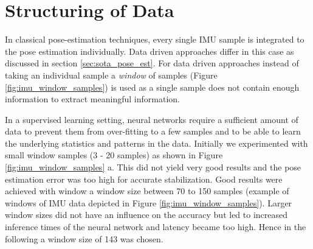 \section{Structuring of Data}
\label{sec:data_structure}
In classical pose-estimation techniques, every single IMU sample is integrated to the pose estimation individually. Data driven approaches differ in this case as discussed in section \ref{sec:sota_pose_est}. For data driven approaches instead of taking an individual sample a \textit{window} of samples (Figure \ref{fig:imu_window_samples}) is used as a single sample does not contain enough information to extract meaningful information. 

In a supervised learning setting, neural networks require a sufficient amount of data to prevent them from over-fitting to a few samples and to be able to learn the underlying statistics and patterns in the data. Initially we experimented with small window samples (3 - 20 samples) as shown in Figure \ref{fig:imu_window_samples} a. This did not yield very good results and the pose estimation error was too high for accurate stabilization. Good results were achieved with window a window size between 70 to 150 samples (example of windows of IMU data depicted in Figure \ref{fig:imu_window_samples}). Larger window sizes did not have an influence on the accuracy but led to increased inference times of the neural network and latency became too high. Hence in the following a window size of 143 was chosen.

